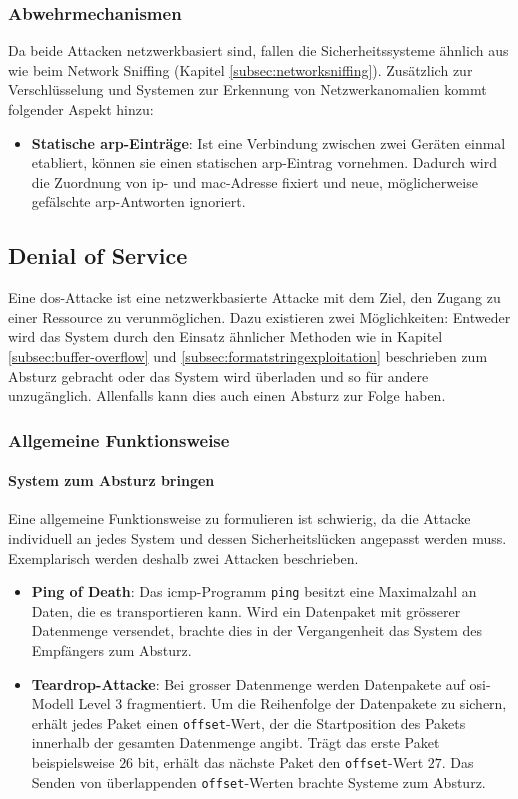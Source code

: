 \documentclass[11pt, a4paper]{article}
\begin{document}
\subsubsection{Abwehrmechanismen}
Da beide Attacken netzwerkbasiert sind, fallen die Sicherheitssysteme ähnlich aus wie beim Network Sniffing (Kapitel \ref{subsec:networksniffing}). Zusätzlich zur Verschlüsselung und Systemen zur Erkennung von Netzwerkanomalien kommt folgender Aspekt hinzu:

\begin{itemize}
	\item \textbf{Statische \gls{arp}-Einträge}: Ist eine Verbindung zwischen zwei Geräten einmal etabliert, können sie einen statischen \gls{arp}-Eintrag vornehmen. Dadurch wird die Zuordnung von \gls{ip}- und \gls{mac}-Adresse fixiert und neue, möglicherweise gefälschte \gls{arp}-Antworten ignoriert.~\cite{WhatisAR:online}
\end{itemize}

\subsection{Denial of Service}
Eine \gls{dos}-Attacke ist eine netzwerkbasierte Attacke mit dem Ziel, den Zugang zu einer Ressource zu verunmöglichen. Dazu existieren zwei Möglichkeiten: Entweder wird das System durch den Einsatz ähnlicher Methoden wie in Kapitel \ref{subsec:buffer-overflow} und \ref{subsec:formatstringexploitation} beschrieben zum Absturz gebracht oder das System wird überladen und so für andere unzugänglich. Allenfalls kann dies auch einen Absturz zur Folge haben.

\subsubsection{Allgemeine Funktionsweise}
\paragraph{System zum Absturz bringen}
Eine allgemeine Funktionsweise zu formulieren ist schwierig, da die Attacke individuell an jedes System und dessen Sicherheitslücken angepasst werden muss. Exemplarisch werden deshalb zwei Attacken beschrieben.
\begin{itemize}
	\item \textbf{Ping of Death}: Das \gls{icmp}-Programm \texttt{ping} besitzt eine Maximalzahl an Daten, die es transportieren kann. Wird ein Datenpaket mit grösserer Datenmenge versendet, brachte dies in der Vergangenheit das System des Empfängers zum Absturz.
	\item \textbf{Teardrop-Attacke}: Bei grosser Datenmenge werden Datenpakete auf \gls{osi}-Modell Level 3 fragmentiert. Um die Reihenfolge der Datenpakete zu sichern, erhält jedes Paket einen \texttt{offset}-Wert, der die Startposition des Pakets innerhalb der gesamten Datenmenge angibt. Trägt das erste Paket beispielsweise \(26\) \gls{bit}, erhält das nächste Paket den \texttt{offset}-Wert \(27\). Das Senden von überlappenden \texttt{offset}-Werten brachte Systeme zum Absturz.
\end{itemize}
\end{document}

